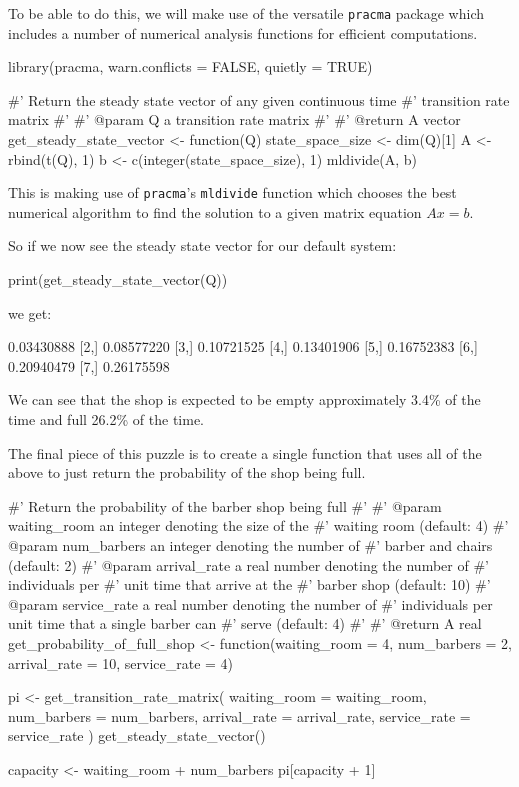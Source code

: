 To be able to do this, we will make use of the versatile \texttt{pracma}
package which includes a number of numerical analysis functions for efficient
computations.

\begin{Rin}
library(pracma, warn.conflicts = FALSE, quietly = TRUE)

#' Return the steady state vector of any given continuous time
#' transition rate matrix
#'
#' @param Q a transition rate matrix
#'
#' @return A vector
get_steady_state_vector <- function(Q){
  state_space_size <- dim(Q)[1]
  A <- rbind(t(Q), 1)
  b <- c(integer(state_space_size), 1)
  mldivide(A, b)
}
\end{Rin}

This is making use of \texttt{pracma}'s \texttt{mldivide} function
which chooses the best numerical algorithm to find the solution to a given
matrix equation \(Ax=b\).

So if we now see the steady state vector for our default system:

\begin{Rin}
print(get_steady_state_vector(Q))
\end{Rin}

we get:

\begin{Rout}
           [,1]
[1,] 0.03430888
[2,] 0.08577220
[3,] 0.10721525
[4,] 0.13401906
[5,] 0.16752383
[6,] 0.20940479
[7,] 0.26175598
\end{Rout}

We can see that the shop is expected to be empty approximately 3.4\% of the time
and full 26.2\% of the time.

The final piece of this puzzle is to create a single function that uses all of
the above to just return the probability of the shop being full.

\begin{Rin}
#' Return the probability of the barber shop being full
#'
#' @param waiting_room an integer denoting the size of the
#'        waiting room (default: 4)
#' @param num_barbers an integer denoting the number of
#'        barber and chairs (default: 2)
#' @param arrival_rate a real number denoting the number of
#'        individuals per #' unit time that arrive at the
#'        barber shop (default: 10)
#' @param service_rate a real number denoting the number of
#'        individuals per unit time that a single barber can
#'        serve (default: 4)
#'
#' @return A real
get_probability_of_full_shop <- function(waiting_room = 4,
                                         num_barbers = 2,
                                         arrival_rate = 10,
                                         service_rate = 4) {
  pi <- get_transition_rate_matrix(
    waiting_room = waiting_room,
    num_barbers = num_barbers,
    arrival_rate = arrival_rate,
    service_rate = service_rate
  ) %
    get_steady_state_vector()

  capacity <- waiting_room + num_barbers
  pi[capacity + 1]
}
\end{Rin}

